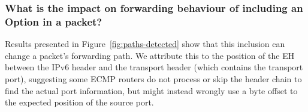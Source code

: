 \documentclass[conference]{IEEEtran}
\begin{document}








\subsubsection{What is the impact on forwarding behaviour of including an Option in a packet?}

Results presented in Figure~\ref{fig:paths-detected} show that this inclusion can change a packet's forwarding path. We attribute this to the position of the EH between the IPv6 header and the transport header (which contains the transport port), suggesting some ECMP routers do not process or skip the header chain to find the actual port information, but might instead wrongly use a byte offset to the expected position of the source port.
\end{document}
